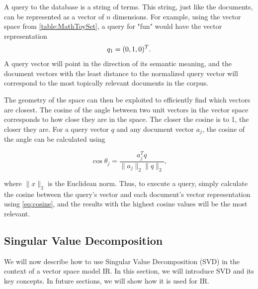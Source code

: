 A query to the database is a string of terms. This string, just like the documents, can be represented as a vector of \(n\) dimensions. For example, using the vector space from \autoref{table:MathToySet}, a query for "fun" would have the vector representation
\begin{equation}
    q_1 = (0, 1, 0)^T. \notag
\end{equation}
A query vector will point in the direction of its semantic meaning, and the document vectors with the least distance to the normalized query vector will correspond to the most topically relevant documents in the corpus.


The geometry of the space can then be exploited to efficiently find which vectors are closest. The cosine of the angle between two unit vectors in the vector space corresponds to how close they are in the space. The closer the cosine is to 1, the closer they are. For a query vector \(q\) and any document vector \(a_j\), the cosine of the angle can be calculated using

\begin{equation}\label{eq:cosine}
    \cos{\theta_j} = \frac{a_j^T q}{\|a_j\|_2 \|q\|_2},
\end{equation}

where \(\|x\|_2\) is the Euclidean norm. Thus, to execute a query, simply calculate the cosine between the query's vector and each document's vector representation using \autoref{eq:cosine}, and the results with the highest cosine values will be the most relevant.


\subsection{Singular Value Decomposition}\label{subsec:SVD}
We will now describe how to use 
Singular Value Decomposition (SVD) in the context of a vector space model IR. In this section, we will introduce SVD and its key 
concepts. In future sections, we will show how it is used for IR.


